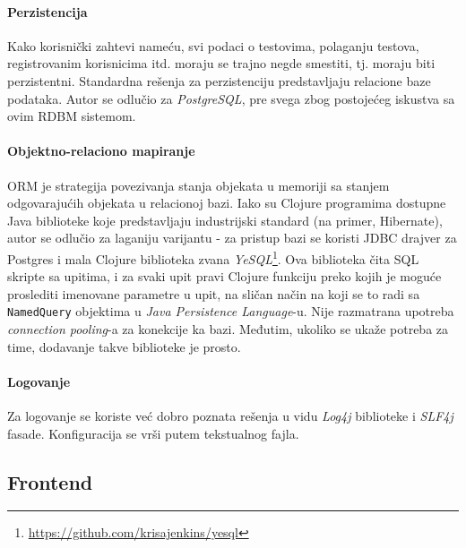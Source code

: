 \paragraph{Perzistencija}
Kako korisnički zahtevi nameću, svi podaci o testovima, polaganju testova, registrovanim korisnicima itd. moraju se trajno negde smestiti, tj. moraju biti perzistentni. Standardna rešenja za perzistenciju predstavljaju relacione baze podataka. Autor se odlučio za \emph{PostgreSQL}\cite{postgres}, pre svega zbog postojećeg iskustva sa ovim RDBM sistemom.

\paragraph{Objektno-relaciono mapiranje}
ORM je strategija povezivanja stanja objekata u memoriji sa stanjem odgovarajućih objekata u relacionoj bazi. Iako su Clojure programima dostupne Java biblioteke koje predstavljaju industrijski standard (na primer, Hibernate), autor se odlučio za laganiju varijantu - za pristup bazi se koristi JDBC drajver za Postgres i mala Clojure biblioteka zvana \emph{YeSQL}\footnote{\url{https://github.com/krisajenkins/yesql}}. Ova biblioteka čita SQL skripte sa upitima, i za svaki upit pravi Clojure funkciju preko kojih je moguće proslediti imenovane parametre u upit, na sličan način na koji se to radi sa \texttt{NamedQuery} objektima u \textit{Java Persistence Language}-u. Nije razmatrana upotreba \textit{connection pooling}-a za konekcije ka bazi. Međutim, ukoliko se ukaže potreba za time, dodavanje takve biblioteke je prosto.

\paragraph{Logovanje} Za logovanje se koriste već dobro poznata rešenja u vidu \emph{Log4j} biblioteke i \emph{SLF4j} fasade. Konfiguracija se vrši putem tekstualnog fajla.

\subsection{Frontend}
